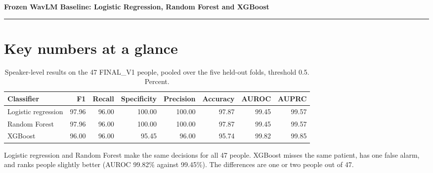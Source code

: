 \documentclass[11pt,a4paper]{article}
\begin{document}
\begin{center}{\LARGE\bfseries Frozen WavLM Baseline: Logistic Regression, Random Forest and XGBoost\par}\vspace{6pt}{\large Baseline subset of the FINAL\_V1 comparison (CSE 431, topic 4a)\par}\vspace{6pt}{\small Arannamoy Mondal. Evidence: frozen protocol FINAL\_V1, 47 people, 785 recordings, five speaker-disjoint folds.\par}\end{center}
\vspace{4pt}\hrule\vspace{6pt}
\tableofcontents
\newpage
\section*{Key numbers at a glance}
\begin{table}[H]\centering\footnotesize\renewcommand{\arraystretch}{1.15}
\caption{Speaker-level results on the 47 FINAL\_V1 people, pooled over the five held-out folds, threshold 0.5. Percent.}
\begin{tabular}{lrrrrrrr}
\toprule
\textbf{Classifier} & \textbf{F1} & \textbf{Recall} & \textbf{Specificity} & \textbf{Precision} & \textbf{Accuracy} & \textbf{AUROC} & \textbf{AUPRC}\\
\midrule
Logistic regression & 97.96 & 96.00 & 100.00 & 100.00 & 97.87 & 99.45 & 99.57\\
Random Forest & 97.96 & 96.00 & 100.00 & 100.00 & 97.87 & 99.45 & 99.57\\
XGBoost & 96.00 & 96.00 & 95.45 & 96.00 & 95.74 & 99.82 & 99.85\\
\bottomrule
\end{tabular}\end{table}
\begin{tcolorbox}[colback=orange!5,colframe=orange!70!black,boxrule=0.5pt,arc=2pt,left=5pt,right=5pt,top=3pt,bottom=3pt,title={\small\bfseries Key point}]\small Logistic regression and Random Forest make the same decisions for all 47 people. XGBoost misses the same patient, has one false alarm, and ranks people slightly better (AUROC 99.82\% against 99.45\%). The differences are one or two people out of 47.\end{tcolorbox}
\end{document}
